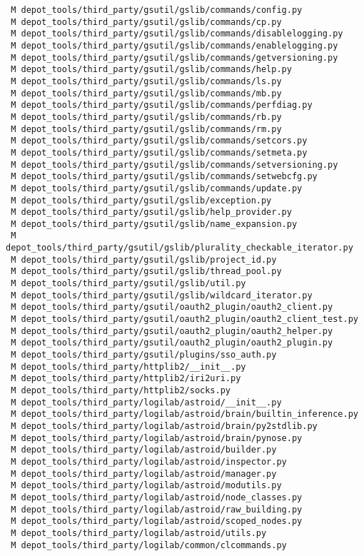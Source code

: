 \documentclass{article}
\begin{document}
\begin{verbatim}
 M depot_tools/third_party/gsutil/gslib/commands/config.py
 M depot_tools/third_party/gsutil/gslib/commands/cp.py
 M depot_tools/third_party/gsutil/gslib/commands/disablelogging.py
 M depot_tools/third_party/gsutil/gslib/commands/enablelogging.py
 M depot_tools/third_party/gsutil/gslib/commands/getversioning.py
 M depot_tools/third_party/gsutil/gslib/commands/help.py
 M depot_tools/third_party/gsutil/gslib/commands/ls.py
 M depot_tools/third_party/gsutil/gslib/commands/mb.py
 M depot_tools/third_party/gsutil/gslib/commands/perfdiag.py
 M depot_tools/third_party/gsutil/gslib/commands/rb.py
 M depot_tools/third_party/gsutil/gslib/commands/rm.py
 M depot_tools/third_party/gsutil/gslib/commands/setcors.py
 M depot_tools/third_party/gsutil/gslib/commands/setmeta.py
 M depot_tools/third_party/gsutil/gslib/commands/setversioning.py
 M depot_tools/third_party/gsutil/gslib/commands/setwebcfg.py
 M depot_tools/third_party/gsutil/gslib/commands/update.py
 M depot_tools/third_party/gsutil/gslib/exception.py
 M depot_tools/third_party/gsutil/gslib/help_provider.py
 M depot_tools/third_party/gsutil/gslib/name_expansion.py
 M depot_tools/third_party/gsutil/gslib/plurality_checkable_iterator.py
 M depot_tools/third_party/gsutil/gslib/project_id.py
 M depot_tools/third_party/gsutil/gslib/thread_pool.py
 M depot_tools/third_party/gsutil/gslib/util.py
 M depot_tools/third_party/gsutil/gslib/wildcard_iterator.py
 M depot_tools/third_party/gsutil/oauth2_plugin/oauth2_client.py
 M depot_tools/third_party/gsutil/oauth2_plugin/oauth2_client_test.py
 M depot_tools/third_party/gsutil/oauth2_plugin/oauth2_helper.py
 M depot_tools/third_party/gsutil/oauth2_plugin/oauth2_plugin.py
 M depot_tools/third_party/gsutil/plugins/sso_auth.py
 M depot_tools/third_party/httplib2/__init__.py
 M depot_tools/third_party/httplib2/iri2uri.py
 M depot_tools/third_party/httplib2/socks.py
 M depot_tools/third_party/logilab/astroid/__init__.py
 M depot_tools/third_party/logilab/astroid/brain/builtin_inference.py
 M depot_tools/third_party/logilab/astroid/brain/py2stdlib.py
 M depot_tools/third_party/logilab/astroid/brain/pynose.py
 M depot_tools/third_party/logilab/astroid/builder.py
 M depot_tools/third_party/logilab/astroid/inspector.py
 M depot_tools/third_party/logilab/astroid/manager.py
 M depot_tools/third_party/logilab/astroid/modutils.py
 M depot_tools/third_party/logilab/astroid/node_classes.py
 M depot_tools/third_party/logilab/astroid/raw_building.py
 M depot_tools/third_party/logilab/astroid/scoped_nodes.py
 M depot_tools/third_party/logilab/astroid/utils.py
 M depot_tools/third_party/logilab/common/clcommands.py

\end{verbatim}
\end{document}
